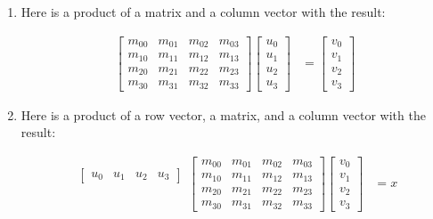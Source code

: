 \documentclass[twoside]{article}
\begin{document}
\begin{enumerate}
  \item Here is a product of a matrix and
      a column vector with the result:

  \begin{align*}
    \begin{bmatrix}
      m_{00} & m_{01} & m_{02} & m_{03} \\
      m_{10} & m_{11} & m_{12} & m_{13} \\
      m_{20} & m_{21} & m_{22} & m_{23} \\
      m_{30} & m_{31} & m_{32} & m_{33} 
      \end{bmatrix}
    \begin{bmatrix}
      u_0 \\
      u_1 \\
      u_2 \\
      u_3
      \end{bmatrix}
    & =
    \begin{bmatrix}
      v_0 \\
      v_1 \\
      v_2 \\
      v_3
      \end{bmatrix}
    \end{align*}

  \item Here is a product of a row vector, a matrix, and a column
    vector with the result:

  \begin{align*}
    \begin{matrix}
    \begin{bmatrix}
        u_0 & u_1 & u_2 & u_3
        \end{bmatrix} \\
        \mbox{} \\
        \mbox{} \\
        \mbox{}
        \end{matrix}
    \begin{bmatrix}
      m_{00} & m_{01} & m_{02} & m_{03} \\
      m_{10} & m_{11} & m_{12} & m_{13} \\
      m_{20} & m_{21} & m_{22} & m_{23} \\
      m_{30} & m_{31} & m_{32} & m_{33} 
      \end{bmatrix}
    \begin{bmatrix}
      v_0 \\
      v_1 \\
      v_2 \\
      v_3
      \end{bmatrix}
    & = x
    \end{align*}


\end{enumerate}
\end{document}

